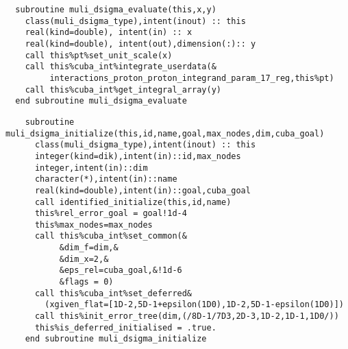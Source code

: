 \begin{Verbatim}
  subroutine muli_dsigma_evaluate(this,x,y)
    class(muli_dsigma_type),intent(inout) :: this
    real(kind=double), intent(in) :: x
    real(kind=double), intent(out),dimension(:):: y
    call this%pt%set_unit_scale(x)
    call this%cuba_int%integrate_userdata(&
         interactions_proton_proton_integrand_param_17_reg,this%pt)
    call this%cuba_int%get_integral_array(y)
  end subroutine muli_dsigma_evaluate
\end{Verbatim}
\begin{Verbatim}
    subroutine muli_dsigma_initialize(this,id,name,goal,max_nodes,dim,cuba_goal)
      class(muli_dsigma_type),intent(inout) :: this
      integer(kind=dik),intent(in)::id,max_nodes
      integer,intent(in)::dim
      character(*),intent(in)::name
      real(kind=double),intent(in)::goal,cuba_goal
      call identified_initialize(this,id,name)
      this%rel_error_goal = goal!1d-4
      this%max_nodes=max_nodes
      call this%cuba_int%set_common(&
           &dim_f=dim,&
           &dim_x=2,&
           &eps_rel=cuba_goal,&!1d-6
           &flags = 0)
      call this%cuba_int%set_deferred&
        (xgiven_flat=[1D-2,5D-1+epsilon(1D0),1D-2,5D-1-epsilon(1D0)])
      call this%init_error_tree(dim,(/8D-1/7D3,2D-3,1D-2,1D-1,1D0/))
      this%is_deferred_initialised = .true.
    end subroutine muli_dsigma_initialize
\end{Verbatim}

